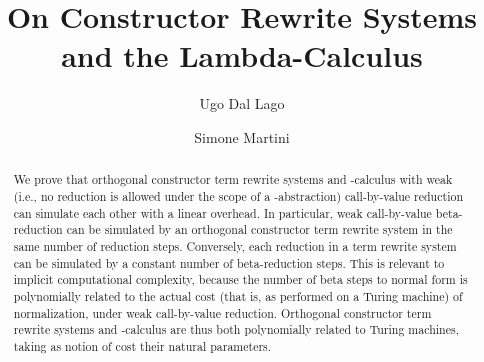 \documentclass{LMCS}
\newcounter{number}
\begin{document}
\title[On Constructor Rewrite Systems and the Lambda-Calculus]{On Constructor Rewrite Systems\\ and the Lambda-Calculus\rsuper*}
\author[U.~Dal Lago]{Ugo Dal Lago}
\author[S.~Martini]{Simone Martini}
\address{Universit\`a di Bologna, and INRIA Sophia Antipolis}

  

\begin{abstract}\noindent
We prove that orthogonal constructor term rewrite systems and -calculus with weak 
(i.e., no reduction is allowed under  the scope of a -abstraction)
call-by-value reduction can simulate each other with a linear overhead.
In particular, weak call-by-value beta-reduction can be simulated by an orthogonal 
constructor term rewrite system in the same number of reduction steps. 
Conversely, each reduction in a term rewrite system can be simulated by a constant number 
of beta-reduction steps. This is relevant to implicit computational complexity, because the number of beta steps 
to normal form is polynomially related to the actual cost (that is, as performed on a Turing 
machine) of normalization, under weak call-by-value reduction. Orthogonal constructor term rewrite systems 
and -calculus are thus both polynomially related to Turing machines, taking as notion 
of cost their natural parameters.
\end{abstract}

\maketitle
\end{document}
